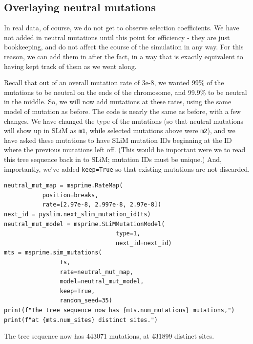 \documentclass[12pt]{article}
\begin{document}
\subsection*{Overlaying neutral mutations}

In real data, of course, we do not get to observe selection coefficients.
We have not added in neutral mutations until this point for efficiency - they are just bookkeeping,
and do not affect the course of the simulation in any way.
For this reason, we can add them in after the fact,
in a way that is exactly equivalent to having kept track of them as we went along.

Recall that out of an overall mutation rate of 3e-8,
we wanted 99\% of the mutations to be neutral on the ends of the chromosome,
and 99.9\% to be neutral in the middle.
So, we will now add mutations at these rates, using the same model of mutation as before.
The code is nearly the same as before, with a few changes.
We have changed the type of the mutations (so that neutral mutations will show up in SLiM as \verb|m1|,
while selected mutations above were \verb|m2|),
and we have asked these mutations to have SLiM mutation IDs beginning at the ID where the previous mutations left off.
(This would be important were we to read this tree sequence back in to SLiM;
mutation IDs must be unique.)
And, importantly, we’ve added \verb|keep=True| so that existing mutations are not discarded.

\begin{listing}[H]
    \begin{verbatim}
neutral_mut_map = msprime.RateMap(
           position=breaks,
           rate=[2.97e-8, 2.997e-8, 2.97e-8])
next_id = pyslim.next_slim_mutation_id(ts)
neutral_mut_model = msprime.SLiMMutationModel(
                                type=1,
                                next_id=next_id)
mts = msprime.sim_mutations(
                ts,
                rate=neutral_mut_map,
                model=neutral_mut_model,
                keep=True, 
                random_seed=35)
print(f"The tree sequence now has {mts.num_mutations} mutations,")
print(f"at {mts.num_sites} distinct sites.")
    \end{verbatim}
\end{listing}

\begin{pycon}
The tree sequence now has 443071 mutations, at 431899 distinct sites.
\end{pycon}
\end{document}
